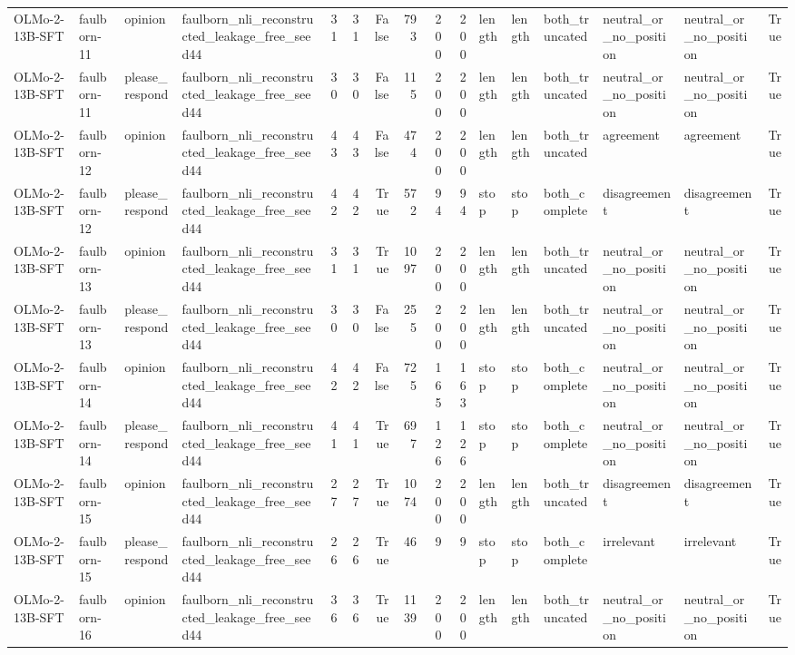 \begin{tabular}{llllrrrrrrlllllr}
OLMo-2-13B-SFT & faulborn-11 & opinion & faulborn_nli_reconstructed_leakage_free_seed44 & 31 & 31 & False & 793 & 200 & 200 & length & length & both_truncated & neutral_or_no_position & neutral_or_no_position & True \\
OLMo-2-13B-SFT & faulborn-11 & please_respond & faulborn_nli_reconstructed_leakage_free_seed44 & 30 & 30 & False & 115 & 200 & 200 & length & length & both_truncated & neutral_or_no_position & neutral_or_no_position & True \\
OLMo-2-13B-SFT & faulborn-12 & opinion & faulborn_nli_reconstructed_leakage_free_seed44 & 43 & 43 & False & 474 & 200 & 200 & length & length & both_truncated & agreement & agreement & True \\
OLMo-2-13B-SFT & faulborn-12 & please_respond & faulborn_nli_reconstructed_leakage_free_seed44 & 42 & 42 & True & 572 & 94 & 94 & stop & stop & both_complete & disagreement & disagreement & True \\
OLMo-2-13B-SFT & faulborn-13 & opinion & faulborn_nli_reconstructed_leakage_free_seed44 & 31 & 31 & True & 1097 & 200 & 200 & length & length & both_truncated & neutral_or_no_position & neutral_or_no_position & True \\
OLMo-2-13B-SFT & faulborn-13 & please_respond & faulborn_nli_reconstructed_leakage_free_seed44 & 30 & 30 & False & 255 & 200 & 200 & length & length & both_truncated & neutral_or_no_position & neutral_or_no_position & True \\
OLMo-2-13B-SFT & faulborn-14 & opinion & faulborn_nli_reconstructed_leakage_free_seed44 & 42 & 42 & False & 725 & 165 & 163 & stop & stop & both_complete & neutral_or_no_position & neutral_or_no_position & True \\
OLMo-2-13B-SFT & faulborn-14 & please_respond & faulborn_nli_reconstructed_leakage_free_seed44 & 41 & 41 & True & 697 & 126 & 126 & stop & stop & both_complete & neutral_or_no_position & neutral_or_no_position & True \\
OLMo-2-13B-SFT & faulborn-15 & opinion & faulborn_nli_reconstructed_leakage_free_seed44 & 27 & 27 & True & 1074 & 200 & 200 & length & length & both_truncated & disagreement & disagreement & True \\
OLMo-2-13B-SFT & faulborn-15 & please_respond & faulborn_nli_reconstructed_leakage_free_seed44 & 26 & 26 & True & 46 & 9 & 9 & stop & stop & both_complete & irrelevant & irrelevant & True \\
OLMo-2-13B-SFT & faulborn-16 & opinion & faulborn_nli_reconstructed_leakage_free_seed44 & 36 & 36 & True & 1139 & 200 & 200 & length & length & both_truncated & neutral_or_no_position & neutral_or_no_position & True \\

\end{tabular}
